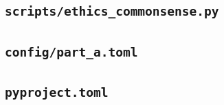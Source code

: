 

\subsection*{\nolinkurl{scripts/ethics_commonsense.py}}



\subsection*{\nolinkurl{config/part_a.toml}}



\subsection*{\nolinkurl{pyproject.toml}}


